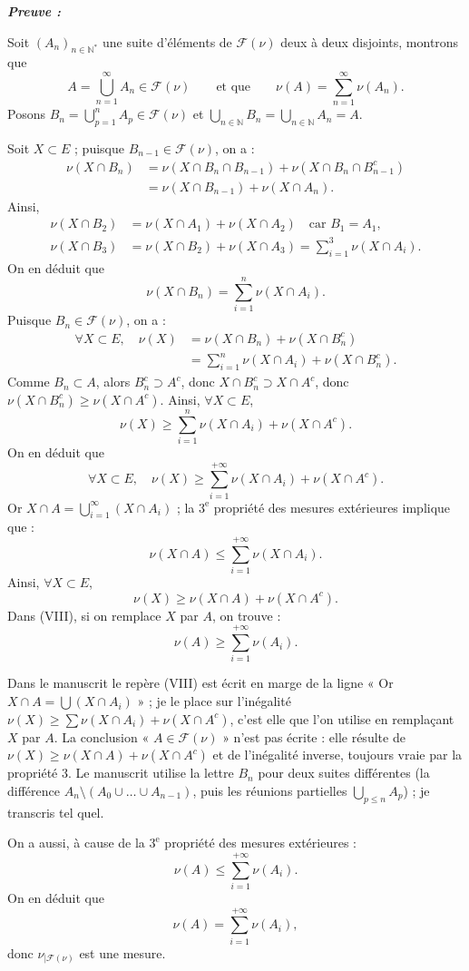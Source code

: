 \documentclass[11pt,a4paper]{article}
\newcommand{\N}{\mathbb{N}}
\newcommand{\Ff}{\mathscr{F}}
\newenvironment{preuve}{\par\textit{\textbf{Preuve :}}\par\nopagebreak[4]}{\par}
\begin{document}
\begin{preuve}
Soit $(A_n)_{n\in\N^*}$ une suite d'éléments de $\Ff(\nu)$ deux à deux disjoints, montrons que
\[
  A=\bigcup_{n=1}^{\infty}A_n\in\Ff(\nu)\qquad\text{et que}\qquad \nu(A)=\sum_{n=1}^{\infty}\nu(A_n).
\]
Posons $B_n=\displaystyle\bigcup_{p=1}^{n}A_p\in\Ff(\nu)$ et $\displaystyle\bigcup_{n\in\N}B_n=\bigcup_{n\in\N}A_n=A$.

Soit $X\subset E$ ; puisque $B_{n-1}\in\Ff(\nu)$, on a :
\begin{align*}
  \nu(X\cap B_n)&=\nu(X\cap B_n\cap B_{n-1})+\nu(X\cap B_n\cap B_{n-1}^c)\\
                &=\nu(X\cap B_{n-1})+\nu(X\cap A_n).
\end{align*}
Ainsi,
\begin{align*}
  \nu(X\cap B_2)&=\nu(X\cap A_1)+\nu(X\cap A_2)\quad\text{car }B_1=A_1,\\
  \nu(X\cap B_3)&=\nu(X\cap B_2)+\nu(X\cap A_3)=\sum_{i=1}^{3}\nu(X\cap A_i).
\end{align*}
On en déduit que
\[
  \nu(X\cap B_n)=\sum_{i=1}^{n}\nu(X\cap A_i).
\]
Puisque $B_n\in\Ff(\nu)$, on a :
\begin{align*}
  \forall X\subset E,\quad \nu(X)&=\nu(X\cap B_n)+\nu(X\cap B_n^c)\\
  &=\sum_{i=1}^{n}\nu(X\cap A_i)+\nu(X\cap B_n^c).
\end{align*}
Comme $B_n\subset A$, alors $B_n^c\supset A^c$, donc $X\cap B_n^c\supset X\cap A^c$, donc $\nu(X\cap B_n^c)\ge\nu(X\cap A^c)$.
Ainsi, $\forall X\subset E$,
\[
  \nu(X)\ge\sum_{i=1}^{n}\nu(X\cap A_i)+\nu(X\cap A^c).
\]
On en déduit que
\begin{equation*}
  \forall X\subset E,\quad \nu(X)\ge\sum_{i=1}^{+\infty}\nu(X\cap A_i)+\nu(X\cap A^c).\tag{VIII}
\end{equation*}
Or $X\cap A=\displaystyle\bigcup_{i=1}^{\infty}(X\cap A_i)$ ; la $3^{\text{e}}$ propriété des mesures extérieures implique que :
\[
  \nu(X\cap A)\le\sum_{i=1}^{+\infty}\nu(X\cap A_i).
\]
Ainsi, $\forall X\subset E$,
\[
  \nu(X)\ge\nu(X\cap A)+\nu(X\cap A^c).
\]
Dans (VIII), si on remplace $X$ par $A$, on trouve :
\[
  \nu(A)\ge\sum_{i=1}^{+\infty}\nu(A_i).
\]

\begin{note}
Dans le manuscrit le repère (VIII) est écrit en marge de la ligne « Or $X\cap A=\bigcup(X\cap A_i)$ » ; je le place sur l'inégalité $\nu(X)\ge\sum\nu(X\cap A_i)+\nu(X\cap A^c)$, c'est elle que l'on utilise en remplaçant $X$ par $A$.
La conclusion « $A\in\Ff(\nu)$ » n'est pas écrite : elle résulte de $\nu(X)\ge\nu(X\cap A)+\nu(X\cap A^c)$ et de l'inégalité inverse, toujours vraie par la propriété 3.
Le manuscrit utilise la lettre $B_n$ pour deux suites différentes (la différence $A_n\setminus(A_0\cup\dots\cup A_{n-1})$, puis les réunions partielles $\bigcup_{p\le n}A_p$) ; je transcris tel quel.
\end{note}

On a aussi, à cause de la $3^{\text{e}}$ propriété des mesures extérieures :
\[
  \nu(A)\le\sum_{i=1}^{+\infty}\nu(A_i).
\]
On en déduit que
\[
  \nu(A)=\sum_{i=1}^{+\infty}\nu(A_i),
\]
donc $\nu_{|\Ff(\nu)}$ est une mesure.
\end{preuve}
\end{document}
